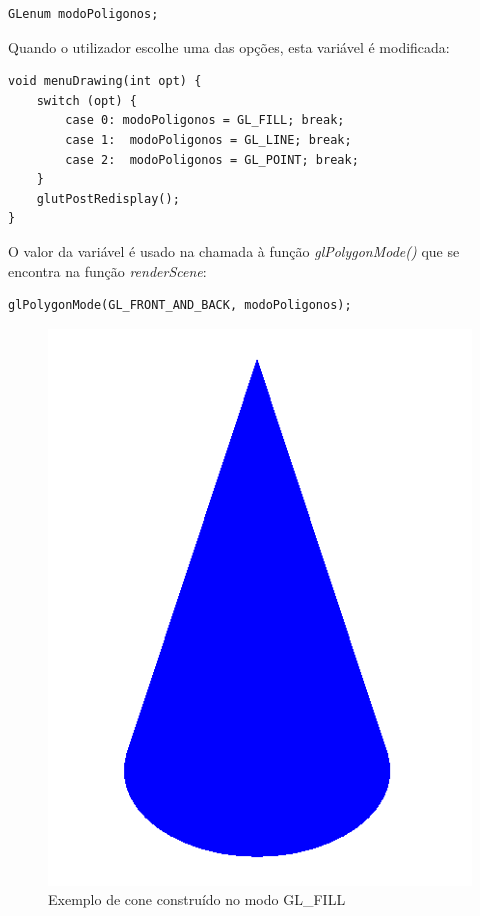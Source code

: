 \begin{Verbatim}
GLenum modoPoligonos;
\end{Verbatim}

Quando o utilizador escolhe uma das opções, esta variável é modificada:

\begin{Verbatim}
void menuDrawing(int opt) {
	switch (opt) {
		case 0: modoPoligonos = GL_FILL; break;
		case 1:  modoPoligonos = GL_LINE; break;
		case 2:  modoPoligonos = GL_POINT; break;
	}
	glutPostRedisplay();
}
\end{Verbatim}

O valor da variável é usado na chamada à função \textit{glPolygonMode()} que se encontra na função \textit{renderScene}:

\begin{Verbatim}
glPolygonMode(GL_FRONT_AND_BACK, modoPoligonos);
\end{Verbatim}

\begin{figure}[<+htpb+>]
	\centering
	\includegraphics[scale=0.2]{imagens/p1_fill.png}
	\caption{Exemplo de cone construído no modo GL\_FILL}
	\label{p1:fig:p1_fill}
\end{figure}

